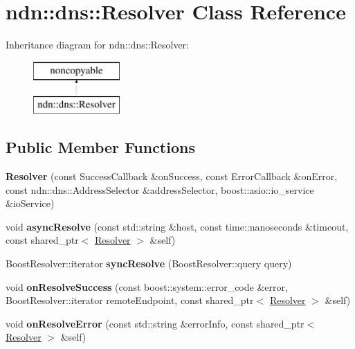 \hypertarget{classndn_1_1dns_1_1Resolver}{}\section{ndn\+:\+:dns\+:\+:Resolver Class Reference}
\label{classndn_1_1dns_1_1Resolver}
Inheritance diagram for ndn\+:\+:dns\+:\+:Resolver\+:\begin{figure}[H]
\begin{center}
\leavevmode
\includegraphics[height=2.000000cm]{classndn_1_1dns_1_1Resolver}
\end{center}
\end{figure}
\subsection*{Public Member Functions}
\begin{DoxyCompactItemize}
\item 
{\bfseries Resolver} (const Success\+Callback \&on\+Success, const Error\+Callback \&on\+Error, const ndn\+::dns\+::\+Address\+Selector \&address\+Selector, boost\+::asio\+::io\+\_\+service \&io\+Service)\hypertarget{classndn_1_1dns_1_1Resolver_a368c155b9cf9a71ea58edd03b378535a}{}\label{classndn_1_1dns_1_1Resolver_a368c155b9cf9a71ea58edd03b378535a}

\item 
void {\bfseries async\+Resolve} (const std\+::string \&host, const time\+::nanoseconds \&timeout, const shared\+\_\+ptr$<$ \hyperlink{classndn_1_1dns_1_1Resolver}{Resolver} $>$ \&self)\hypertarget{classndn_1_1dns_1_1Resolver_a8560af5f752ffb8e9ce938be8d47a835}{}\label{classndn_1_1dns_1_1Resolver_a8560af5f752ffb8e9ce938be8d47a835}

\item 
Boost\+Resolver\+::iterator {\bfseries sync\+Resolve} (Boost\+Resolver\+::query query)\hypertarget{classndn_1_1dns_1_1Resolver_aaebea82997a5879c0aba6cbcbc8b3219}{}\label{classndn_1_1dns_1_1Resolver_aaebea82997a5879c0aba6cbcbc8b3219}

\item 
void {\bfseries on\+Resolve\+Success} (const boost\+::system\+::error\+\_\+code \&error, Boost\+Resolver\+::iterator remote\+Endpoint, const shared\+\_\+ptr$<$ \hyperlink{classndn_1_1dns_1_1Resolver}{Resolver} $>$ \&self)\hypertarget{classndn_1_1dns_1_1Resolver_a54179988bac5f37bab5b34dc6f038f29}{}\label{classndn_1_1dns_1_1Resolver_a54179988bac5f37bab5b34dc6f038f29}

\item 
void {\bfseries on\+Resolve\+Error} (const std\+::string \&error\+Info, const shared\+\_\+ptr$<$ \hyperlink{classndn_1_1dns_1_1Resolver}{Resolver} $>$ \&self)\hypertarget{classndn_1_1dns_1_1Resolver_a12172c3cc091c5e793443a1f917c7103}{}\label{classndn_1_1dns_1_1Resolver_a12172c3cc091c5e793443a1f917c7103}

\end{DoxyCompactItemize}
